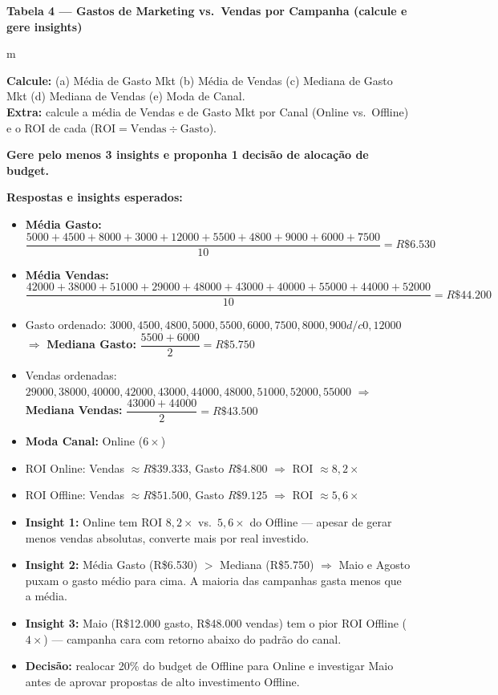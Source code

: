 \begin{BoardBox}
\textbf{Tabela 4 — Gastos de Marketing vs.\ Vendas por Campanha (calcule e gere insights)}

\medskip
m

\smallskip
\textbf{Calcule:}
(a) Média de Gasto Mkt \quad
(b) Média de Vendas \quad
(c) Mediana de Gasto Mkt \quad
(d) Mediana de Vendas \quad
(e) Moda de Canal. \\
\textbf{Extra:} calcule a média de Vendas e de Gasto Mkt por Canal
(Online vs.\ Offline) e o ROI de cada ($\text{ROI} = \text{Vendas} \div \text{Gasto}$).

\smallskip
\textbf{Gere pelo menos 3 insights e proponha 1 decisão de alocação de budget.}

\smallskip
\textbf{Respostas e insights esperados:}
\begin{itemize}
  \item \textbf{Média Gasto:} $\dfrac{5000+4500+8000+3000+12000+5500+4800+9000+6000+7500}{10} = R\$6.530$
  \item \textbf{Média Vendas:} $\dfrac{42000+38000+51000+29000+48000+43000+40000+55000+44000+52000}{10} = R\$44.200$
  \item Gasto ordenado: $3000, 4500, 4800, 5000, 5500, 6000, 7500, 8000, 900
  d/c0, 12000$
    $\Rightarrow$ \textbf{Mediana Gasto:} $\dfrac{5500+6000}{2} = R\$5.750$
  \item Vendas ordenadas: $29000, 38000, 40000, 42000, 43000, 44000, 48000, 51000, 52000, 55000$
    $\Rightarrow$ \textbf{Mediana Vendas:} $\dfrac{43000+44000}{2} = R\$43.500$
  \item \textbf{Moda Canal:} Online ($6\times$)
  \item ROI Online: Vendas $\approx R\$39.333$, Gasto $R\$4.800$ $\Rightarrow$ ROI $\approx 8{,}2\times$
  \item ROI Offline: Vendas $\approx R\$51.500$, Gasto $R\$9.125$ $\Rightarrow$ ROI $\approx 5{,}6\times$
  \item \textbf{Insight 1:} Online tem ROI $8{,}2\times$ vs.\ $5{,}6\times$ do Offline —
  apesar de gerar menos vendas absolutas, converte mais por real investido.
  \item \textbf{Insight 2:} Média Gasto (R\$6.530) $>$ Mediana (R\$5.750) $\Rightarrow$
  Maio e Agosto puxam o gasto médio para cima. A maioria das campanhas gasta menos que a média.
  \item \textbf{Insight 3:} Maio (R\$12.000 gasto, R\$48.000 vendas) tem o pior
  ROI Offline ($4\times$) — campanha cara com retorno abaixo do padrão do canal.
  \item \textbf{Decisão:} realocar 20\% do budget de Offline para Online e
  investigar Maio antes de aprovar propostas de alto investimento Offline.
\end{itemize}
\end{BoardBox}

